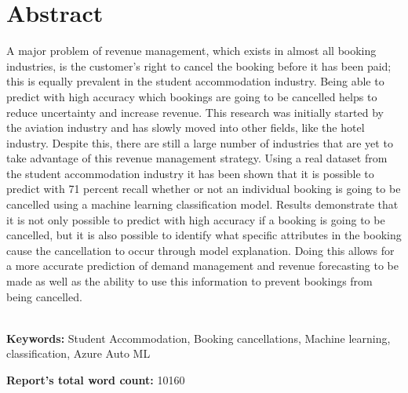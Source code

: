 \chapter*{\center \Large  Abstract}

A major problem of revenue management, which exists in almost all booking industries, is the customer's right to cancel the booking before it has been paid; this is equally prevalent in the student accommodation industry. Being able to predict with high accuracy which bookings are going to be cancelled helps to reduce uncertainty and increase revenue. This research was initially started by the aviation industry and has slowly moved into other fields, like the hotel industry. Despite this, there are still a large number of industries that are yet to take advantage of this revenue management strategy. Using a real dataset from the student accommodation industry it has been shown that it is possible to predict with 71 percent recall whether or not an individual booking is going to be cancelled using a machine learning classification model. Results demonstrate that it is not only possible to predict with high accuracy if a booking is going to be cancelled, but it is also possible to identify what specific attributes in the booking cause the cancellation to occur through model explanation. Doing this allows for a more accurate prediction of demand management and revenue forecasting to be made as well as the ability to use this information to prevent bookings from being cancelled.

~\\[1cm]
\noindent
\textbf{Keywords:} Student Accommodation, Booking cancellations, Machine learning, classification, Azure Auto ML 

\vfill
\noindent
\textbf{Report's total word count:} 10160


